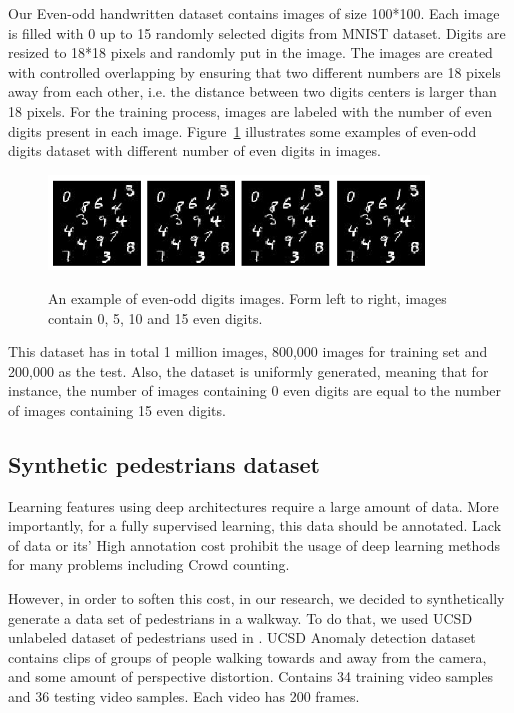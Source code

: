 Our Even-odd handwritten dataset contains images of size 100*100. Each image is filled with 0 up to 15 randomly selected digits from MNIST dataset. Digits are resized to 18*18 pixels and randomly put in the image. The images are created with controlled overlapping by ensuring that two different numbers are 18 pixels away from each other, i.e. the distance between two digits centers is larger than 18 pixels. For the training process, images are labeled with the number of even digits present in each image. Figure~\ref{fig:l2cmnist} illustrates some examples of even-odd digits dataset with different number of even digits in images. 

\begin{figure}[H]
	\centering
	{\includegraphics[width=0.9\textwidth]{images/l2cmnist}}
		\caption{An example of even-odd digits images. Form left to right, images contain 0, 5, 10 and 15 even digits.}
	\label{fig:l2cmnist}
\end{figure}

\indent This dataset has in total 1 million images, 800,000 images for training set and 200,000 as the test. Also, the dataset is uniformly generated, meaning that for instance, the number of images containing 0 even digits are equal to the number of images containing 15 even digits.  

\subsection{Synthetic pedestrians dataset}

Learning features using deep architectures require a large amount of data. More importantly, for a fully supervised learning, this data should be annotated. Lack of data or its' High annotation cost prohibit the usage of deep learning methods for many problems including Crowd counting. 

\indent However, in order to soften this cost, in our research, we decided to synthetically generate a data set of pedestrians in a walkway. To do that, we used UCSD unlabeled dataset of pedestrians used in \cite{chan2009analysis, mahadevan2010anomaly, li2014anomaly}. UCSD Anomaly detection dataset contains clips of groups of people walking towards and away from the camera, and some amount of perspective distortion. Contains 34 training video samples and 36 testing video samples. Each video has 200 frames.

